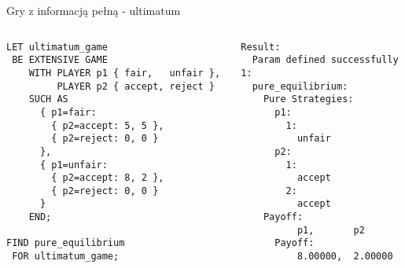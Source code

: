 \documentclass[xcolor=x11names,compress]{beamer}
\renewcommand{\(}{\begin{columns}}
\renewcommand{\)}{\end{columns}}
\newcommand{\<}[1]{\begin{column}{#1}}
\renewcommand{\>}{\end{column}}
\begin{document}
\begin{frame}[fragile]{Gry z informacją pełną - ultimatum}
\begin{columns}[c]
\begin{column}{.5\textwidth}
\begin{lstlisting}
LET ultimatum_game
 BE EXTENSIVE GAME
    WITH PLAYER p1 { fair,   unfair },
         PLAYER p2 { accept, reject }
    SUCH AS
      { p1=fair:
        { p2=accept: 5, 5 },
        { p2=reject: 0, 0 }
      },
      { p1=unfair:
        { p2=accept: 8, 2 },
        { p2=reject: 0, 0 }
      }
    END;

FIND pure_equilibrium
 FOR ultimatum_game;
\end{lstlisting}
\end{column}
\vrule
\begin{column}{.5\textwidth}
\begin{lstlisting}
Result:
  Param defined successfully
1:
  pure_equilibrium:
    Pure Strategies:
      p1:
        1:
          unfair
      p2:
        1:
          accept
        2:
          accept
    Payoff:
          p1,       p2
      Payoff:
          8.00000,  2.00000
\end{lstlisting}
\end{column}
\end{columns}
\end{frame}
\end{document}
